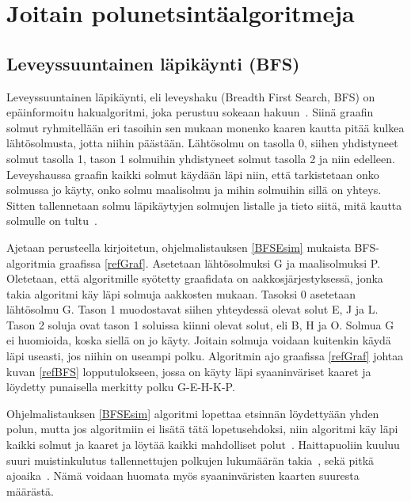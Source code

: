 \chapter{Joitain polunetsintäalgoritmeja}\label{joitainP}

\section{Leveyssuuntainen läpikäynti (BFS)}\label{bfs}
Leveyssuuntainen läpikäynti, eli leveyshaku (Breadth First Search, BFS) on 
epäinformoitu hakualgoritmi, joka perustuu sokeaan 
hakuun~\cite{applSciLawande}. Siinä graafin solmut ryhmitellään eri tasoihin 
sen mukaan monenko kaaren kautta pitää kulkea lähtösolmusta, jotta niihin 
päästään. Lähtösolmu on tasolla 0, siihen yhdistyneet solmut tasolla 1, 
tason 1 solmuihin yhdistyneet solmut tasolla 2 ja niin edelleen. 
Leveyshaussa graafin kaikki solmut käydään läpi niin, että tarkistetaan 
onko solmussa jo käyty, onko solmu maalisolmu ja mihin solmuihin sillä on 
yhteys. Sitten tallennetaan solmu läpikäytyjen solmujen listalle ja tieto 
siitä, mitä kautta solmulle on tultu~\cite{BFSRahim}. \par
	Ajetaan \textcite{applSciLawande} perusteella 
kirjoitetun, ohjelmalistauksen \ref{BFSEsim} mukaista BFS-algoritmia graafissa 
\ref{refGraf}. Asetetaan lähtösolmuksi G ja maalisolmuksi P. Oletetaan, että 
algoritmille syötetty graafidata on aakkosjärjestyksessä, jonka takia 
algoritmi käy läpi solmuja aakkosten mukaan. Tasoksi 0 asetetaan lähtösolmu G. 
Tason 1 muodostavat siihen yhteydessä olevat solut E, J ja L. Tason 2 soluja 
ovat tason 1 soluissa kiinni olevat solut, eli B, H ja O. Solmua G ei 
huomioida, koska siellä on jo käyty. Joitain solmuja voidaan kuitenkin käydä 
läpi useasti, jos niihin on useampi polku. Algoritmin ajo graafissa 
\ref{refGraf} johtaa kuvan \ref{refBFS} lopputulokseen, jossa on käyty läpi 
syaaninväriset kaaret ja löydetty punaisella merkitty polku G-E-H-K-P. \par
	Ohjelmalistauksen \ref{BFSEsim} algoritmi lopettaa etsinnän 
löydettyään yhden polun, mutta jos algoritmiin ei lisätä tätä lopetusehdoksi, 
niin algoritmi käy läpi kaikki solmut ja kaaret ja löytää kaikki mahdolliset 
polut~\cite{BFSRahim}. Haittapuoliin kuuluu suuri muistinkulutus tallennettujen 
polkujen lukumäärän takia~\cite{BFSRahim}, sekä pitkä 
ajoaika~\cite{mazeGameTrilogi}. Nämä voidaan huomata myös syaaninväristen 
kaarten suuresta määrästä.

